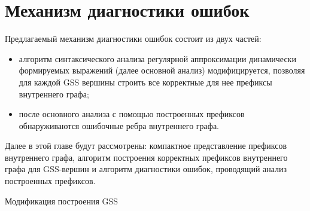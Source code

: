\section{Механизм диагностики ошибок}
Предлагаемый механизм диагностики ошибок состоит из двух частей:
\begin{itemize}
    \item алгоритм синтаксического анализа регулярной аппроксимации динамически формируемых выражений (далее основной анализ) модифицируется, позволяя для каждой GSS вершины строить все корректные для нее префиксы внутреннего графа;
    \item после основного анализа с помощью построенных префиксов обнаруживаются ошибочные ребра внутреннего графа.
\end{itemize}
Далее в этой главе будут рассмотрены: компактное представление префиксов внутреннего графа, алгоритм построения корректных префиксов внутреннего графа для GSS-вершин и алгоритм диагностики ошибок, проводящий анализ построенных префиксов.

\begin{algorithm}[ht]
\begin{algorithmic}[1]
\caption{Модификация построения GSS}
\label{addEdge_mod}

    \EndIf
      \EndFor
    \EndIf
  \EndIf
  \EndIf
\EndFunction
\end{algorithmic}
\end{algorithm}

